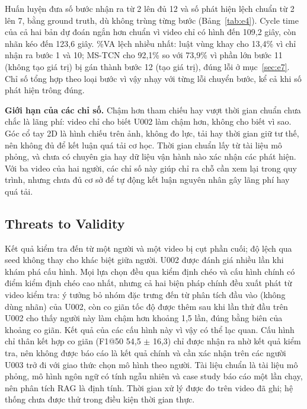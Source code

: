 Huấn luyện đưa số bước nhận ra từ 2 lên đủ 12 và số phát hiện lệch chuẩn từ 2 lên 7, bằng ground truth, dù không trùng từng bước (Bảng~\ref{tab:e4}). Cycle time của cả hai bản dự đoán ngắn hơn chuẩn vì video chỉ có hình đến 109,2 giây, còn nhãn kéo đến 123,6 giây. \%VA lệch nhiều nhất: luật vùng khay cho 13,4\% vì chỉ nhận ra bước 1 và 10; MS-TCN cho 92,1\% so với 73,9\% vì phần lớn bước 11 (không tạo giá trị) bị gán thành bước 12 (tạo giá trị), đúng lỗi ở mục~\ref{sec:e7}. Chỉ số tổng hợp theo loại bước vì vậy nhạy với từng lỗi chuyển bước, kể cả khi số phát hiện trông đúng.

\textbf{Giới hạn của các chỉ số.} Chậm hơn tham chiếu hay vượt thời gian chuẩn chưa chắc là lãng phí: video chỉ cho biết U002 làm chậm hơn, không cho biết vì sao. Góc cổ tay 2D là hình chiếu trên ảnh, không đo lực, tải hay thời gian giữ tư thế, nên không đủ để kết luận quá tải cơ học. Thời gian chuẩn lấy từ tài liệu mô phỏng, và chưa có chuyên gia hay dữ liệu vận hành nào xác nhận các phát hiện. Với ba video của hai người, các chỉ số này giúp chỉ ra chỗ cần xem lại trong quy trình, nhưng chưa đủ cơ sở để tự động kết luận nguyên nhân gây lãng phí hay quá tải.

\subsection{Threats to Validity}\label{sec:e10}

Kết quả kiểm tra đến từ một người và một video bị cụt phần cuối; độ lệch qua seed không thay cho khác biệt giữa người. U002 được đánh giá nhiều lần khi khám phá cấu hình. Mọi lựa chọn đều qua kiểm định chéo và cấu hình chính có điểm kiểm định chéo cao nhất, nhưng cả hai biện pháp chính đều xuất phát từ video kiểm tra: ý tưởng bỏ nhóm đặc trưng đến từ phân tích đầu vào (không dùng nhãn) của U002, còn co giãn tốc độ được thêm sau khi lần thử đầu trên U002 cho thấy người này làm chậm hơn khoảng 1,5 lần, đúng bằng biên của khoảng co giãn. Kết quả của các cấu hình này vì vậy có thể lạc quan. Cấu hình chỉ thân kết hợp co giãn (F1@50 54,5 $\pm$ 16,3) chỉ được nhận ra nhờ kết quả kiểm tra, nên không được báo cáo là kết quả chính và cần xác nhận trên các người U003 trở đi với giao thức chọn mô hình theo người. Tài liệu chuẩn là tài liệu mô phỏng, mô hình ngôn ngữ có tính ngẫu nhiên và case study báo cáo một lần chạy, nên phân tích RAG là định tính. Thời gian xử lý được đo trên video đã ghi; hệ thống chưa được thử trong điều kiện thời gian thực.
